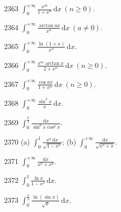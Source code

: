 \begin{prob}[S]{2363}
$\displaystyle\int_0^{+\infty} \frac{x^m}{1 + x^n}\,\mathrm{d}x\ (n \geqslant 0)$.
\end{prob}

\begin{prob}[S]{2364}
$\displaystyle\int_0^{+\infty} \frac{\arctan ax}{x^n}\,\mathrm{d}x\ (a \neq 0)$.
\end{prob}

\begin{prob}[S]{2365}
$\displaystyle\int_0^{+\infty} \frac{\ln(1 + x)}{x^n}\,\mathrm{d}x$.
\end{prob}

\begin{prob}[S]{2366}
$\displaystyle\int_0^{+\infty} \frac{x^m \arctan x}{2 + x^n}\,\mathrm{d}x\ (n \geqslant 0)$.
\end{prob}

\begin{prob}[S]{2367}
$\displaystyle\int_0^{+\infty} \frac{\cos ax}{1 + x^n}\,\mathrm{d}x\ (n \geqslant 0)$.
\end{prob}

\begin{prob}[S]{2368}
$\displaystyle\int_0^{+\infty} \frac{\sin^2 x}{x}\,\mathrm{d}x$.
\end{prob}

\begin{prob}[S]{2369}
$\displaystyle\int_0^{\frac{\pi}{2}} \frac{\mathrm{d}x}{\sin^p x \cos^q x}$.
\end{prob}

\begin{prob}[M]{2370}
(a) $\displaystyle\int_0^1 \frac{x^n\,\mathrm{d}x}{\sqrt{1 - x^2}}$; \qquad (b) $\displaystyle\int_0^{+\infty} \frac{\mathrm{d}x}{\sqrt{x^3 + x}}$.
\end{prob}

\begin{prob}[S]{2371}
$\displaystyle\int_0^{+\infty} \frac{\mathrm{d}x}{x^p + x^q}$.
\end{prob}

\begin{prob}[S]{2372}
$\displaystyle\int_0^1 \frac{\ln x}{1 - x^2}\,\mathrm{d}x$.
\end{prob}

\begin{prob}[S]{2373}
$\displaystyle\int_0^{\frac{\pi}{2}} \frac{\ln(\sin x)}{\sqrt{x}}\,\mathrm{d}x$.
\end{prob}


